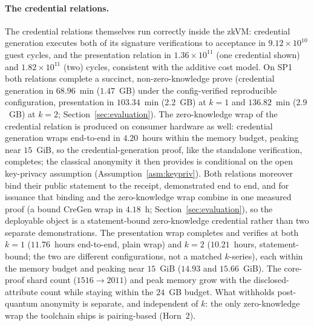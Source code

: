 \paragraph{The credential relations.}
The credential relations themselves run correctly inside the zkVM: credential generation executes both of its signature verifications to acceptance in $9.12\times10^{10}$ guest cycles, and the presentation relation in $1.36\times10^{11}$ (one credential shown) and $1.82\times10^{11}$ (two) cycles, consistent with the additive cost model. On SP1 both relations complete a succinct, non-zero-knowledge prove (credential generation in $68.96$~min ($1.47$~GB) under the config-verified reproducible configuration, presentation in $103.34$~min ($2.2$~GB) at $k{=}1$ and $136.82$~min ($2.9$~GB) at $k{=}2$; Section~\ref{sec:evaluation}). The zero-knowledge wrap of the credential relation is produced on consumer hardware as well: credential generation wraps end-to-end in $4.20$~hours within the memory budget, peaking near $15$~GiB, so the credential-generation proof, like the standalone verification, completes; the classical anonymity it then provides is conditional on the open key-privacy assumption (Assumption~\ref{asm:keypriv}). Both relations moreover bind their public statement to the receipt, demonstrated end to end, and for issuance that binding and the zero-knowledge wrap combine in one measured proof (a bound CreGen wrap in $4.18$~h; Section~\ref{sec:evaluation}), so the deployable object is a statement-bound zero-knowledge credential rather than two separate demonstrations. The presentation wrap completes and verifies at both $k=1$ ($11.76$~hours end-to-end, plain wrap) and $k=2$ ($10.21$~hours, statement-bound; the two are different configurations, not a matched $k$-series), each within the memory budget and peaking near $15$~GiB ($14.93$ and $15.66$~GiB). The core-proof shard count ($1516\to2011$) and peak memory grow with the disclosed-attribute count while staying within the $24$~GB budget. What withholds post-quantum anonymity is separate, and independent of $k$: the only zero-knowledge wrap the toolchain ships is pairing-based (Horn~2).


